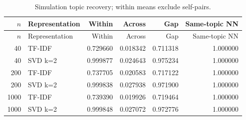 {\small\renewcommand{\arraystretch}{1.05}
\begin{longtable}{rlrrrr}
\caption{Simulation topic recovery; within means exclude self-pairs.}\\
\toprule
$n$ & Representation & Within & Across & Gap & Same-topic NN \\ \midrule\endfirsthead
\toprule
$n$ & Representation & Within & Across & Gap & Same-topic NN \\ \midrule\endhead
40 & TF-IDF & 0.729660 & 0.018342 & 0.711318 & 1.000000 \\
40 & SVD k=2 & 0.999877 & 0.024643 & 0.975234 & 1.000000 \\
200 & TF-IDF & 0.737705 & 0.020583 & 0.717122 & 1.000000 \\
200 & SVD k=2 & 0.999838 & 0.027938 & 0.971900 & 1.000000 \\
1000 & TF-IDF & 0.739390 & 0.019926 & 0.719464 & 1.000000 \\
1000 & SVD k=2 & 0.999848 & 0.027072 & 0.972776 & 1.000000 \\
\bottomrule
\end{longtable}
}
